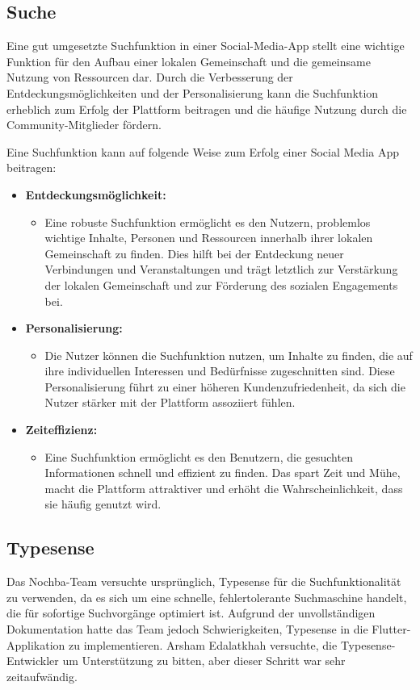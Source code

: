 \subsection{Suche}

Eine gut umgesetzte Suchfunktion in einer Social-Media-App stellt eine wichtige Funktion für den Aufbau einer lokalen Gemeinschaft und die gemeinsame Nutzung von Ressourcen dar. Durch die Verbesserung der Entdeckungsmöglichkeiten und der Personalisierung kann die Suchfunktion erheblich zum Erfolg der Plattform beitragen und die häufige Nutzung durch die Community-Mitglieder fördern.

Eine Suchfunktion kann auf folgende Weise zum Erfolg einer Social Media App beitragen:

\begin{itemize}
  \item \textbf{Entdeckungsmöglichkeit:}
        \begin{itemize}
          \item {Eine robuste Suchfunktion ermöglicht es den Nutzern, problemlos wichtige Inhalte, Personen und Ressourcen innerhalb ihrer lokalen Gemeinschaft zu finden. Dies hilft bei der Entdeckung neuer Verbindungen und Veranstaltungen und trägt letztlich zur Verstärkung der lokalen Gemeinschaft und zur Förderung des sozialen Engagements bei.}
        \end{itemize}
  \item \textbf{Personalisierung:}
        \begin{itemize}
          \item {Die Nutzer können die Suchfunktion nutzen, um Inhalte zu finden, die auf ihre individuellen Interessen und Bedürfnisse zugeschnitten sind. Diese Personalisierung führt zu einer höheren Kundenzufriedenheit, da sich die Nutzer stärker mit der Plattform assoziiert fühlen.}
        \end{itemize}
  \item \textbf{Zeiteffizienz:}
        \begin{itemize}
          \item {Eine Suchfunktion ermöglicht es den Benutzern, die gesuchten Informationen schnell und effizient zu finden. Das spart Zeit und Mühe, macht die Plattform attraktiver und erhöht die Wahrscheinlichkeit, dass sie häufig genutzt wird.}
        \end{itemize}
\end{itemize}

\subsection{Typesense}
Das Nochba-Team versuchte ursprünglich, Typesense für die Suchfunktionalität zu verwenden, da es sich um eine schnelle, fehlertolerante Suchmaschine handelt, die für sofortige Suchvorgänge optimiert ist. Aufgrund der unvollständigen Dokumentation hatte das Team jedoch Schwierigkeiten, Typesense in die Flutter-Applikation zu implementieren. Arsham Edalatkhah versuchte, die Typesense-Entwickler um Unterstützung zu bitten, aber dieser Schritt war sehr zeitaufwändig.

